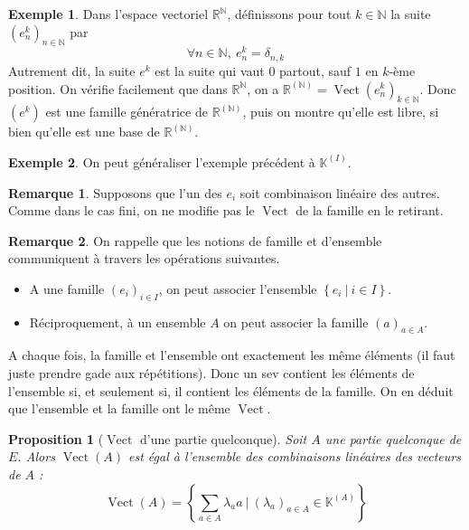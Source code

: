 \documentclass[french]{book}
\newcommand{\N}{\mathbb{N}}
\newcommand{\R}{\mathbb{R}}
\newcommand{\K}{\mathbb{K}}
\theoremstyle{plain}
\newtheorem{prop}{Proposition}[chapter]
\theoremstyle{definition}
\newtheorem{exa}{Exemple}[chapter]
\newtheorem{rmq}{Remarque}[chapter]
\theoremstyle{remark}
\DeclareMathOperator{\vect}{Vect}
\begin{document}
\begin{exa}
	Dans l'espace vectoriel $\R^\N$, définissons pour tout $k\in\N$ la suite $(e_n^k)_{n\in\N}$ par $$\forall n\in\N,\ e_n^k=\delta_{n,k}$$ Autrement dit, la suite $e^k$ est la suite qui vaut $0$ partout, sauf $1$ en $k$-ème position. On vérifie facilement que dans $\R^\N$, on a $\R^{(\N)}=\vect(e_n^k)_{k\in\N}$. Donc $(e^k)$ est une famille génératrice de $\R^{(\N)}$, puis on montre qu'elle est libre, si bien qu'elle est une base de $\R^{(\N)}$.
\end{exa}
\begin{exa}
	On peut généraliser l'exemple précédent à $\K^{(I)}$.
\end{exa}
\begin{rmq}
	Supposons que l'un des $e_i$ soit combinaison linéaire des autres. Comme dans le cas fini, on ne modifie pas le $\vect$ de la famille en le retirant.
\end{rmq}
\begin{rmq}
	On rappelle que les notions de famille et d'ensemble communiquent à travers les opérations suivantes.
	\begin{itemize}
		\item A une famille $(e_i)_{i\in I}$, on peut associer l'ensemble $\left\{e_i\ | \ i\in I\right\}$.
		\item Réciproquement, à un ensemble $A$ on peut associer la famille $(a)_{a\in A}$.
	\end{itemize}
	A chaque fois, la famille et l'ensemble ont exactement les même éléments (il faut juste prendre gade aux répétitions). Donc un sev contient les éléments de l'ensemble si, et seulement si, il contient les éléments de la famille. On en déduit que l'ensemble et la famille ont le même $\vect$.
\end{rmq}
\begin{prop}[$\vect$ d'une partie quelconque]
	Soit $A$ une partie quelconque de $E$. Alors $\vect(A)$ est égal à l'ensemble des combinaisons linéaires des vecteurs de $A$ : $$\vect(A)=\left\{\sum_{a\in A}\lambda_aa\ | \ (\lambda_a)_{a\in A}\in\K^{(A)}\right\}$$
\end{prop}
\end{document}
